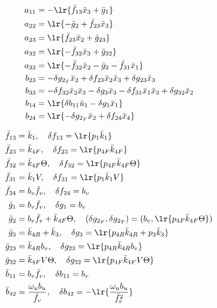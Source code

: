 \begin{itemize}
\begin{minipage}{0.49 \textwidth}
\begin{align*}
    \footnotesize
    a_{11} &= -\lr{ \bar f_{13} \bar x_3 + \bar g_1 } \\
    a_{22} &= \lr{ -\bar g_2 + \bar f_{23} \bar x_3 } \\
    a_{23} &= \lr{\bar f_{23} \bar x_2 + \bar g_{23}} \\
    a_{32} &= \lr{-\bar f_{32} \bar x_3 + \bar g_{32} } \\
    a_{33} &= \lr{-\bar f_{32} \bar x_2 - \bar g_3 - \bar f_{31} \bar x_1}  \\
    b_{23} &= -\delta g_{2_T} \bar x_2 + \delta f_{23} \bar x_2 \bar x_3 + \delta g_{23} \bar x_3 \\
    b_{33} &= -\delta f_{32} \bar x_2 \bar x_3 - \delta g_3 \bar x_3 - \delta f_{31} \bar x_1 \bar x_3 + \delta g_{32} \bar x_2 \\
    b_{14} &= \lr{\delta b_{11} \bar u_1- \delta g_1 \bar x_1} \\
    b_{24} &= \lr{-\delta g_{2_F} \bar x_2 + \delta f_{24} \bar x_4 }\\
\end{align*}
\end{minipage}
\begin{minipage}{0.49\textwidth}
\begin{align*}
    \footnotesize
    \bar f_{13} &= \bar k_{1}, \quad
    \delta f_{13}  = \lr{ p_{1} \bar k_{1} } \\
    \bar f_{23} &= \bar k_{4F}, \quad
    \delta f_{23} = \lr{ p_{4F} \bar k_{4F} } \\
    \bar f_{32} &= \bar k_{4F} \Theta, \quad
    \delta f_{32}  = \lr{ p_{4F}  \bar k_{4F} \Theta }
    \\
    \bar f_{31} &= \bar k_1 V, \quad
    \delta f_{31}  = \lr{ p_1 \bar k_1 V }
    \\
    \bar f_{24} &= b_v \bar f_v,
    \quad
    \delta f_{24}  = b_v
    \\
   \bar g_1 &= b_v \bar f_v,
    \quad
    \delta g_1  = b_v
    \\
   \bar g_2 &= b_v \bar f_v + \bar k_{4F} \Theta,
    \quad
    (\delta g_{2_F} , \delta g_{2_T}) = (b_v,  \lr{ p_{4F}  \bar k_{4F}  \Theta })
    \\
    \bar g_3 &= \bar k_{4R} + \bar k_3,
    \quad
    \delta g_3 = \lr{ p_{4R} \bar k_{4R} + p_3 \bar k_3}
    \\
    \bar g_{23} &= \bar k_{4R} b_v,
    \quad
    \delta g_{23}  = \lr{ p_{4R} \bar k_{4R} b_v }
    \\
    \bar g_{32} &= \bar k_{4F} V \Theta,
    \quad
    \delta g_{32}  = \lr{ p_{4F} \bar k_{4F} V \Theta }
    \\
    \bar b_{11} &= b_v \bar f_v,
    \quad
    \delta b_{11}  = b_v
    \\
    \bar b_{42} &= \frac{\omega_u b_u}{\bar f_v},
    \quad
    \delta b_{42}  = -\lr{\frac{\omega_u b_u}{\bar f_v^2}}
\end{align*}
\end{minipage}

\end{itemize}
